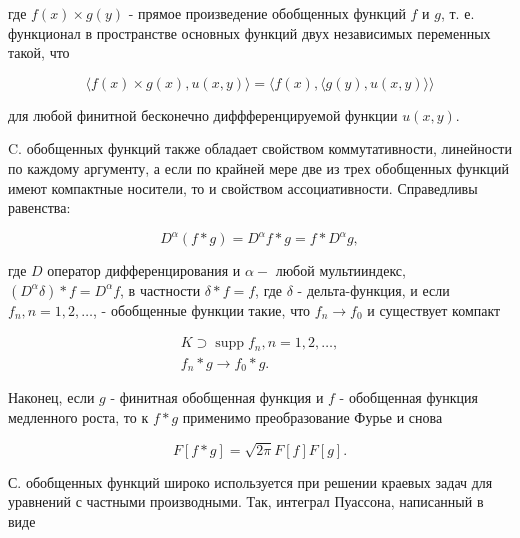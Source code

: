 \documentclass[10pt]{article}
\begin{document}
где $f(x) \times g(y)$ - прямое произведение обобщенных функций $f$ и $g$, т. е. функционал в пространстве основных функций двух независимых переменных такой, что



\[

\langle f(x) \times g(x), u(x, y)\rangle=\langle f(x),\langle g(y), u(x, y)\rangle\rangle

\]



для любой финитной бесконечно диффференцируемой функции $u(x, y)$.



C. обобщенных функций также обладает свойством коммутативности, линейности по каждому аргументу, а если по крайней мере две из трех обобщенных функций имеют компактные носители, то и свойством ассоциативности. Справедливы равенства:



\[

D^{\alpha}(f * g)=D^{\alpha} f * g=f * D^{\alpha} g,

\]



где $D$ оператор дифференцирования и $\alpha-$ любой мультииндекс, $\left(D^{\alpha} \delta\right) * f=D^{\alpha} f$, в частности $\delta * f=f$, где $\delta$ - дельта-функция, и если $f_{n}, n=1,2, \ldots$, - обобщенные функции такие, что $f_{n} \rightarrow f_{0}$ и существует компакт



\[

\begin{gathered}

K \supset \operatorname{supp} f_{n}, n=1,2, \ldots, \\

f_{n} * g \rightarrow f_{0} * g .

\end{gathered}

\]



Наконец, если $g$ - финитная обобщенная функция и $f$ - обобщенная функция медленного роста, то к $f * g$ применимо преобразование Фурье и снова



\[

F[f * g]=\sqrt{2 \pi} F[f] F[g] .

\]



С. обобщенных функций широко используется при решении краевых задач для уравнений с частными производными. Так, интеграл Пуассона, написанный в виде
\end{document}
